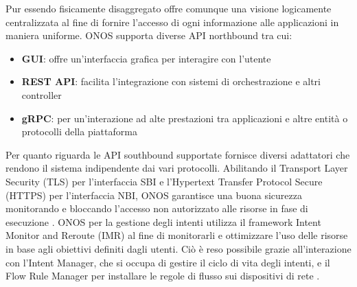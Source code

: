 \newline Pur essendo fisicamente disaggregato offre comunque una visione logicamente centralizzata al fine di fornire l'accesso di ogni informazione alle applicazioni in maniera uniforme.
\newline ONOS supporta diverse API northbound tra cui:
\begin{itemize}
\item \textbf{GUI}: offre un'interfaccia grafica per interagire con l'utente
\item \textbf{REST API}: facilita l'integrazione con sistemi di orchestrazione e altri controller 
\item \textbf{gRPC}: per un'interazione ad alte prestazioni tra applicazioni e altre entità o protocolli della piattaforma
\end{itemize}
Per quanto riguarda le API southbound supportate fornisce diversi adattatori che rendono il sistema indipendente dai vari protocolli.
\newline Abilitando il Transport Layer Security (TLS) per l'interfaccia SBI e l'Hypertext Transfer Protocol Secure (HTTPS) per l'interfaccia NBI, 
ONOS garantisce una buona sicurezza monitorando e bloccando l'accesso non autorizzato alle risorse in fase di esecuzione \cite{artONOS}.
\newline 
\newline ONOS per la gestione degli intenti utilizza il framework Intent Monitor and Reroute (IMR) al fine di monitorarli e ottimizzare l'uso delle risorse in base agli obiettivi definiti dagli utenti.
Ciò è reso possibile grazie all'interazione con l'Intent Manager, che si occupa di gestire il ciclo di vita degli intenti, e il Flow Rule Manager per installare le regole di flusso sui dispositivi di rete \cite{onosint}.

